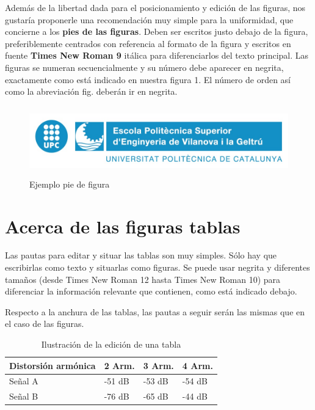 \documentclass[10pt,a4paper,twoside]{article}
\begin{document}
\begin{multicols}{2}
    Además de la libertad dada para el posicionamiento y edición de las figuras, nos gustaría proponerle una recomendación muy simple para la uniformidad, que concierne a los \textbf{pies de las figuras}. Deben ser escritos justo debajo de la figura, preferiblemente centrados con referencia al formato de la figura y escritos en fuente \textbf{Times New Roman 9} itálica para diferenciarlos del texto principal. Las figuras se numeran secuencialmente y su número debe aparecer en negrita, exactamente como está indicado en nuestra figura 1. El número de orden así como la abreviación fig. deberán ir en negrita.

    \begin{figure}[H]
        \begin{center}
          \includegraphics[width=\linewidth, height=3cm]{../report/media/epsevg_logo.jpeg}
        \end{center}
        \caption{Ejemplo pie de figura}\label{fig:ex}
    \end{figure}

    \section{Acerca de las figuras tablas}

    Las pautas para editar y situar las tablas son muy simples. Sólo hay que escribirlas como texto y situarlas como figuras. Se puede usar negrita y diferentes tamaños (desde Times New Roman 12 hasta Times New Roman 10) para diferenciar la información relevante que contienen, como está indicado debajo.
    
    Respecto a la anchura de las tablas, las pautas a seguir serán las mismas que en el caso de las figuras.

    \begin{table}[H]
        \begin{center}
            \begin{tabular}{| l | l | l | l |} 
                \hline
                Distorsión armónica & 2 Arm. & 3 Arm. & 4 Arm. \\
                \hline
                Señal A & -51 dB & -53 dB & -54 dB \\
                \hline
                Señal B & -76 dB & -65 dB & -44 dB \\
                \hline
            \end{tabular}
        \end{center}
        \caption{Ilustración de la edición de una tabla}
        \label{table:ex}
    \end{table}


\end{multicols}
\end{document}
